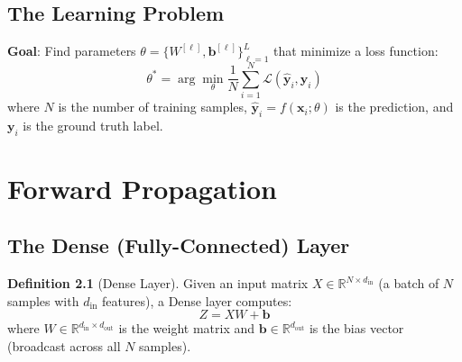 \documentclass[12pt, a4paper]{report}
\theoremstyle{definition}
\newtheorem{definition}{Definition}[chapter]
\begin{document}
\section{The Learning Problem}

\textbf{Goal}: Find parameters $\theta = \{W^{[\ell]}, \mathbf{b}^{[\ell]}\}_{\ell=1}^{L}$ that minimize a loss function:
\begin{equation}
    \theta^* = \arg\min_\theta \frac{1}{N} \sum_{i=1}^{N} \mathcal{L}(\hat{\mathbf{y}}_i, \mathbf{y}_i)
\end{equation}
where $N$ is the number of training samples, $\hat{\mathbf{y}}_i = f(\mathbf{x}_i; \theta)$ is the prediction, and $\mathbf{y}_i$ is the ground truth label.


\chapter{Forward Propagation}

\section{The Dense (Fully-Connected) Layer}

\begin{definition}[Dense Layer]
Given an input matrix $X \in \mathbb{R}^{N \times d_\text{in}}$ (a batch of $N$ samples with $d_\text{in}$ features), a Dense layer computes:
\begin{equation}
    Z = X W + \mathbf{b}
\end{equation}
where $W \in \mathbb{R}^{d_\text{in} \times d_\text{out}}$ is the weight matrix and $\mathbf{b} \in \mathbb{R}^{d_\text{out}}$ is the bias vector (broadcast across all $N$ samples).
\end{definition}
\end{document}
